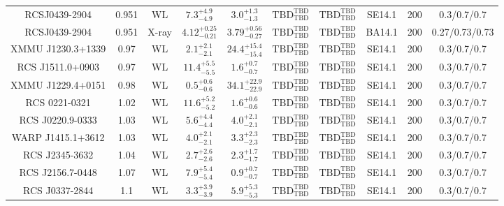 \begin{table}
\begin{tabular}{cccccccccc}
RCSJ0439-2904 & 0.951 & WL & ${7.3}^{+4.9}_{-4.9}$ & ${3.0}^{+1.3}_{-1.3}$ & ${\mathrm{TBD}}^{\mathrm{TBD}}_{\mathrm{TBD}}$ & ${\mathrm{TBD}}^{\mathrm{TBD}}_{\mathrm{TBD}}$ & SE14.1 & 200 & 0.3/0.7/0.7 \\
RCSJ0439-2904 & 0.951 & X-ray & ${4.12}^{+0.25}_{-0.21}$ & ${3.79}^{+0.56}_{-0.27}$ & ${\mathrm{TBD}}^{\mathrm{TBD}}_{\mathrm{TBD}}$ & ${\mathrm{TBD}}^{\mathrm{TBD}}_{\mathrm{TBD}}$ & BA14.1 & 200 & 0.27/0.73/0.73 \\
XMMU J1230.3+1339 & 0.97 & WL & ${2.1}^{+2.1}_{-2.1}$ & ${24.4}^{+15.4}_{-15.4}$ & ${\mathrm{TBD}}^{\mathrm{TBD}}_{\mathrm{TBD}}$ & ${\mathrm{TBD}}^{\mathrm{TBD}}_{\mathrm{TBD}}$ & SE14.1 & 200 & 0.3/0.7/0.7 \\
RCS J1511.0+0903 & 0.97 & WL & ${11.4}^{+5.5}_{-5.5}$ & ${1.6}^{+0.7}_{-0.7}$ & ${\mathrm{TBD}}^{\mathrm{TBD}}_{\mathrm{TBD}}$ & ${\mathrm{TBD}}^{\mathrm{TBD}}_{\mathrm{TBD}}$ & SE14.1 & 200 & 0.3/0.7/0.7 \\
XMMU J1229.4+0151 & 0.98 & WL & ${0.5}^{+0.6}_{-0.6}$ & ${34.1}^{+22.9}_{-22.9}$ & ${\mathrm{TBD}}^{\mathrm{TBD}}_{\mathrm{TBD}}$ & ${\mathrm{TBD}}^{\mathrm{TBD}}_{\mathrm{TBD}}$ & SE14.1 & 200 & 0.3/0.7/0.7 \\
RCS 0221-0321 & 1.02 & WL & ${11.6}^{+5.2}_{-5.2}$ & ${1.6}^{+0.6}_{-0.6}$ & ${\mathrm{TBD}}^{\mathrm{TBD}}_{\mathrm{TBD}}$ & ${\mathrm{TBD}}^{\mathrm{TBD}}_{\mathrm{TBD}}$ & SE14.1 & 200 & 0.3/0.7/0.7 \\
RCS J0220.9-0333 & 1.03 & WL & ${5.6}^{+4.4}_{-4.4}$ & ${4.0}^{+2.1}_{-2.1}$ & ${\mathrm{TBD}}^{\mathrm{TBD}}_{\mathrm{TBD}}$ & ${\mathrm{TBD}}^{\mathrm{TBD}}_{\mathrm{TBD}}$ & SE14.1 & 200 & 0.3/0.7/0.7 \\
WARP J1415.1+3612 & 1.03 & WL & ${4.0}^{+2.1}_{-2.1}$ & ${3.3}^{+2.3}_{-2.3}$ & ${\mathrm{TBD}}^{\mathrm{TBD}}_{\mathrm{TBD}}$ & ${\mathrm{TBD}}^{\mathrm{TBD}}_{\mathrm{TBD}}$ & SE14.1 & 200 & 0.3/0.7/0.7 \\
RCS J2345-3632 & 1.04 & WL & ${2.7}^{+2.6}_{-2.6}$ & ${2.3}^{+1.7}_{-1.7}$ & ${\mathrm{TBD}}^{\mathrm{TBD}}_{\mathrm{TBD}}$ & ${\mathrm{TBD}}^{\mathrm{TBD}}_{\mathrm{TBD}}$ & SE14.1 & 200 & 0.3/0.7/0.7 \\
RCS J2156.7-0448 & 1.07 & WL & ${7.9}^{+5.4}_{-5.4}$ & ${0.9}^{+0.7}_{-0.7}$ & ${\mathrm{TBD}}^{\mathrm{TBD}}_{\mathrm{TBD}}$ & ${\mathrm{TBD}}^{\mathrm{TBD}}_{\mathrm{TBD}}$ & SE14.1 & 200 & 0.3/0.7/0.7 \\
RCS J0337-2844 & 1.1 & WL & ${3.3}^{+3.9}_{-3.9}$ & ${5.9}^{+5.3}_{-5.3}$ & ${\mathrm{TBD}}^{\mathrm{TBD}}_{\mathrm{TBD}}$ & ${\mathrm{TBD}}^{\mathrm{TBD}}_{\mathrm{TBD}}$ & SE14.1 & 200 & 0.3/0.7/0.7 \\

\end{tabular}
\end{table}
